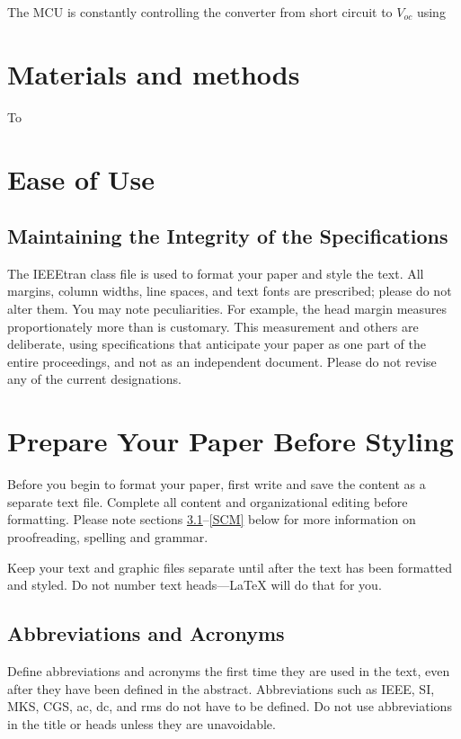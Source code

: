 \documentclass[conference]{IEEEtran}
\begin{document}
The MCU is constantly controlling the converter from short circuit to $V_{oc}$ using 








\section{Materials and methods}
To 




\section{Ease of Use}

\subsection{Maintaining the Integrity of the Specifications}

The IEEEtran class file is used to format your paper and style the text. All margins, 
column widths, line spaces, and text fonts are prescribed; please do not 
alter them. You may note peculiarities. For example, the head margin
measures proportionately more than is customary. This measurement 
and others are deliberate, using specifications that anticipate your paper 
as one part of the entire proceedings, and not as an independent document. 
Please do not revise any of the current designations.

\section{Prepare Your Paper Before Styling}
Before you begin to format your paper, first write and save the content as a 
separate text file. Complete all content and organizational editing before 
formatting. Please note sections \ref{AA}--\ref{SCM} below for more information on 
proofreading, spelling and grammar.

Keep your text and graphic files separate until after the text has been 
formatted and styled. Do not number text heads---{\LaTeX} will do that 
for you.

\subsection{Abbreviations and Acronyms}\label{AA}
Define abbreviations and acronyms the first time they are used in the text, 
even after they have been defined in the abstract. Abbreviations such as 
IEEE, SI, MKS, CGS, ac, dc, and rms do not have to be defined. Do not use 
abbreviations in the title or heads unless they are unavoidable.
\end{document}
